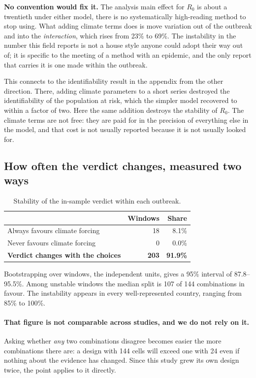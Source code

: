\documentclass[11pt,a4paper]{article}
\begin{document}
\textbf{No convention would fix it.} The analysis main effect for $R_0$ is about a
twentieth under either model, there is no systematically high-reading method to
stop using. What adding climate terms does is move variation out of the outbreak
and into the \emph{interaction}, which rises from 23\% to 69\%. The instability in
the number this field reports is not a house style anyone could adopt their way
out of; it is specific to the meeting of a method with an epidemic, and the only
report that carries it is one made within the outbreak.

This connects to the identifiability result in the appendix from the other
direction. There, adding climate parameters to a short series destroyed the
identifiability of the population at risk, which the simpler model recovered to
within a factor of two. Here the same addition destroys the stability of $R_0$.
The climate terms are not free: they are paid for in the precision of everything
else in the model, and that cost is not usually reported because it is not usually
looked for.

\subsection{How often the verdict changes, measured two ways}

\begin{table}[htbp]
\centering
\caption{Stability of the in-sample verdict within each outbreak.}
\begin{tabular}{lrr}
\toprule
& Windows & Share \\
\midrule
Always favours climate forcing & 18 & 8.1\% \\
Never favours climate forcing & 0 & 0.0\% \\
\textbf{Verdict changes with the choices} & \textbf{203} & \textbf{91.9\%} \\
\bottomrule
\end{tabular}
\end{table}

Bootstrapping over windows, the independent units, gives a 95\% interval of
87.8--95.5\%. Among unstable windows the median split is 107 of 144 combinations
in favour. The instability appears in every well-represented country, ranging
from 85\% to 100\%.

\paragraph{That figure is not comparable across studies, and we do not rely on
it.} Asking whether \emph{any} two combinations disagree becomes easier the more
combinations there are: a design with 144 cells will exceed one with 24 even if
nothing about the evidence has changed. Since this study grew its own design
twice, the point applies to it directly.
\end{document}
